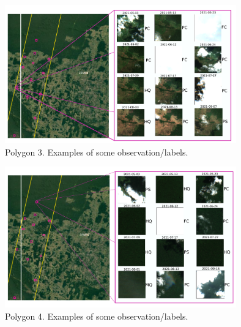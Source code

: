 \documentclass{beamer}
\begin{document}
\begin{frame}
    \begin{figure}
        \includegraphics[width=10cm]{Figures/v3/labeling/polygon_4.pdf}
        \caption{Polygon 3. Examples of some observation/labels.}  
        \centering
    \end{figure}
\end{frame}

\begin{frame}
    \begin{figure}
        \includegraphics[width=10cm]{Figures/v3/labeling/polygon_11.pdf}
        \caption{Polygon 4. Examples of some observation/labels.}  
        \centering
    \end{figure}
\end{frame}
\end{document}
